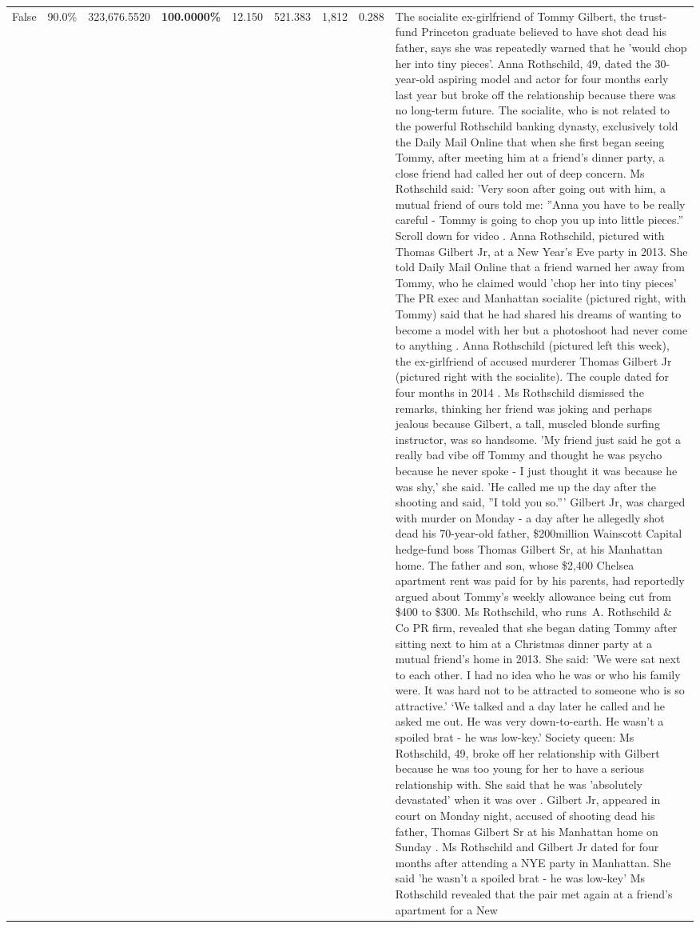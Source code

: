 \begin{table}[H]
\begin{tabular}{lllrlllll}
False & 90.0\% & 323,676.5520 & \bfseries \color{red} 100.0000\% & 12.150 & 521.383 & 1,812 & 0.288 & The socialite ex-girlfriend of Tommy Gilbert, the trust-fund Princeton graduate believed to have shot dead his father, says she was repeatedly warned that he 'would chop her into tiny pieces'. Anna Rothschild, 49, dated the 30-year-old aspiring model and actor for four months early last year but broke off the relationship because there was no long-term future. The socialite, who is not related to the powerful Rothschild banking dynasty, exclusively told the Daily Mail Online that when she first began seeing Tommy, after meeting him at a friend's dinner party, a close friend had called her out of deep concern. Ms Rothschild said: 'Very soon after going out with him, a mutual friend of ours told me: ''Anna you have to be really careful - Tommy is going to chop you up into little pieces.'' Scroll down for video . Anna Rothschild, pictured with Thomas Gilbert Jr, at a New Year's Eve party in 2013. She told Daily Mail Online that a friend warned her away from Tommy, who he claimed would 'chop her into tiny pieces' The PR exec and Manhattan socialite (pictured right, with Tommy) said that he had shared his dreams of wanting to become a model with her but a photoshoot had never come to anything . Anna Rothschild (pictured left this week), the ex-girlfriend of accused murderer Thomas Gilbert Jr (pictured right with the socialite). The couple dated for four months in 2014 . Ms Rothschild dismissed the remarks, thinking her friend was joking and perhaps jealous because Gilbert, a tall, muscled blonde surfing instructor, was so handsome. 'My friend just said he got a really bad vibe off Tommy and thought he was psycho because he never spoke - I just thought it was because he was shy,' she said. 'He called me up the day after the shooting and said, ''I told you so.''' Gilbert Jr, was charged with murder on Monday - a day after he allegedly shot dead his 70-year-old father, \$200million Wainscott Capital hedge-fund boss Thomas Gilbert Sr, at his Manhattan home. The father and son, whose \$2,400 Chelsea apartment rent was paid for by his parents, had reportedly argued about Tommy's weekly allowance being cut from \$400 to \$300. Ms Rothschild, who runs A. Rothschild \& Co PR firm, revealed that she began dating Tommy after sitting next to him at a Christmas dinner party at a mutual friend's home in 2013. She said: 'We were sat next to each other. I had no idea who he was or who his family were. It was hard not to be attracted to someone who is so attractive.' ‘We talked and a day later he called and he asked me out. He was very down-to-earth. He wasn’t a spoiled brat - he was low-key.’ Society queen: Ms Rothschild, 49, broke off her relationship with Gilbert because he was too young for her to have a serious relationship with. She said that he was 'absolutely devastated' when it was over . Gilbert Jr, appeared in court on Monday night, accused of shooting dead his father, Thomas Gilbert Sr at his Manhattan home on Sunday . Ms Rothschild and Gilbert Jr dated for four months after attending a NYE party in Manhattan. She said 'he wasn't a spoiled brat - he was low-key' Ms Rothschild revealed that the pair met again at a friend’s apartment for a New 
\end{tabular}
\end{table}
